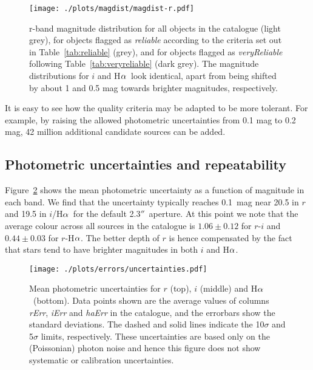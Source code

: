 \documentclass[useAMS,usenatbib]{mn2e}
\def\ha{\mbox{H$\rm \alpha$}}
\def\arcsec{$''$}
\begin{document}
\begin{figure}
    \texttt{[image: ./plots/magdist/magdist-r.pdf]} 
    \caption{r-band magnitude distribution for all objects in the catalogue 
    (light grey), for objects flagged as \emph{reliable} 
    according to the criteria set out in Table~\ref{tab:reliable} (grey),
    and for objects flagged as \emph{veryReliable} 
    following Table~\ref{tab:veryreliable} (dark grey).
    The magnitude distributions for $i$ and \ha\
    look identical, apart from being shifted
    by about 1 and 0.5 mag towards brighter magnitudes,
    respectively.}
    \label{fig:magdist}
\end{figure}

It is easy to see how the quality criteria
may be adapted to be more tolerant.
For example, by raising the allowed photometric uncertainties
from 0.1 mag to 0.2 mag, 42 million additional candidate sources can be added.

\subsection{Photometric uncertainties and repeatability}

Figure~\ref{fig:uncertainties} shows the mean photometric
uncertainty as a function of magnitude in each band.
We find that the uncertainty typically
reaches 0.1~mag near 20.5 in $r$ 
and 19.5 in $i$/\ha\ for the default 2.3\arcsec\ aperture.
At this point we note that the average colour
across all sources in the catalogue is
$1.06\pm0.12$ for $r$-$i$ and $0.44\pm0.03$ for $r$-\ha.
The better depth of $r$ is hence compensated
by the fact that stars tend to have 
brighter magnitudes in both $i$ and \ha.

\begin{figure}
    \texttt{[image: ./plots/errors/uncertainties.pdf]} 
    \caption{Mean photometric uncertainties
             for $r$ (top), $i$ (middle) and \ha\ (bottom).
             Data points shown are the average values of
             columns \emph{rErr}, \emph{iErr} and \emph{haErr}
             in the catalogue, 
             and the errorbars show the standard deviations.
             The dashed and solid lines indicate 
             the 10$\sigma$ and 5$\sigma$ limits, respectively.
             These uncertainties are based only on the (Poissonian)
             photon noise and hence this figure does not show
             systematic or calibration uncertainties.}
    \label{fig:uncertainties}
\end{figure}
\end{document}
